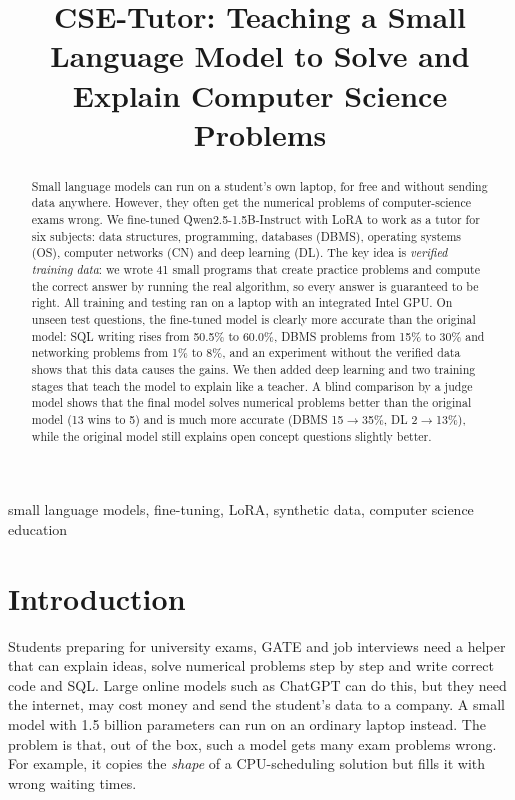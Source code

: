 \documentclass[conference]{IEEEtran}
\newcommand{\ra}{$\rightarrow$}
\begin{document}
\title{CSE-Tutor: Teaching a Small Language Model to Solve and Explain Computer Science Problems}

\author{
}

\maketitle

\begin{abstract}
Small language models can run on a student's own laptop, for free and without sending data anywhere. However, they often get the numerical problems of computer-science exams wrong. We fine-tuned Qwen2.5-1.5B-Instruct with LoRA to work as a tutor for six subjects: data structures, programming, databases (DBMS), operating systems (OS), computer networks (CN) and deep learning (DL). The key idea is \emph{verified training data}: we wrote 41 small programs that create practice problems and compute the correct answer by running the real algorithm, so every answer is guaranteed to be right. All training and testing ran on a laptop with an integrated Intel GPU. On unseen test questions, the fine-tuned model is clearly more accurate than the original model: SQL writing rises from 50.5\% to 60.0\%, DBMS problems from 15\% to 30\% and networking problems from 1\% to 8\%, and an experiment without the verified data shows that this data causes the gains. We then added deep learning and two training stages that teach the model to explain like a teacher. A blind comparison by a judge model shows that the final model solves numerical problems better than the original model (13 wins to 5) and is much more accurate (DBMS 15\ra 35\%, DL 2\ra 13\%), while the original model still explains open concept questions slightly better.
\end{abstract}

\begin{IEEEkeywords}
small language models, fine-tuning, LoRA, synthetic data, computer science education
\end{IEEEkeywords}

\section{Introduction}
Students preparing for university exams, GATE and job interviews need a helper that can explain ideas, solve numerical problems step by step and write correct code and SQL. Large online models such as ChatGPT can do this, but they need the internet, may cost money and send the student's data to a company. A small model with 1.5 billion parameters can run on an ordinary laptop instead. The problem is that, out of the box, such a model gets many exam problems wrong. For example, it copies the \emph{shape} of a CPU-scheduling solution but fills it with wrong waiting times.
\end{document}
